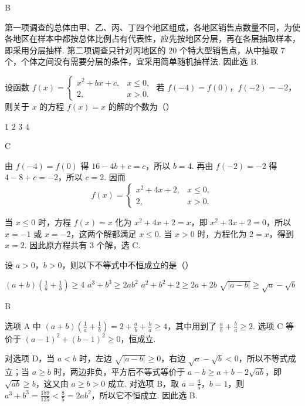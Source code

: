\begin{answer}
B
\end{answer}

\begin{solution}
第一项调查的总体由甲、乙、丙、丁四个地区组成，各地区销售点数量不同，为使各地区在样本中都按总体比例占有代表性，应先按地区分层，再在各层抽取样本，即采用分层抽样. 第二项调查只针对丙地区的 \(20\) 个特大型销售点，从中抽取 \(7\) 个，个体之间没有需要分层的条件，宜采用简单随机抽样法. 因此选 B.
\end{solution}

\begin{problem}
设函数 \(f(x)=\begin{cases}
x^2+bx+c, & x\leqslant 0,\\
2, & x>0.
\end{cases}\) 若 \(f(-4)=f(0)\)，\(f(-2)=-2\)，则关于 \(x\) 的方程 \(f(x)=x\) 的解的个数为（\quad）

\choices
    {\(1\)}
    {\(2\)}
    {\(3\)}
    {\(4\)}
\end{problem}

\begin{answer}
C
\end{answer}

\begin{solution}
由 \(f(-4)=f(0)\) 得 \(16-4b+c=c\)，所以 \(b=4\). 再由 \(f(-2)=-2\) 得 \(4-8+c=-2\)，所以 \(c=2\). 因而
\[
f(x)=\begin{cases}
x^2+4x+2,&x\leqslant0,\\
2,&x>0.
\end{cases}
\]

当 \(x\leqslant0\) 时，方程 \(f(x)=x\) 化为 \(x^2+4x+2=x\)，即 \(x^2+3x+2=0\)，所以 \(x=-1\) 或 \(x=-2\)，这两个解都满足 \(x\leqslant0\). 当 \(x>0\) 时，方程化为 \(2=x\)，得到 \(x=2\). 因此原方程共有 \(3\) 个解，选 C.
\end{solution}

\begin{problem}
设 \(a>0\)，\(b>0\)，则以下不等式中不恒成立的是（\quad）

\choices
    {\(\left(a+b\right)\left(\frac{1}{a}+\frac{1}{b}\right)\geqslant 4\)}
    {\(a^3+b^3\geqslant 2ab^2\)}
    {\(a^2+b^2+2\geqslant 2a+2b\)}
    {\(\sqrt{|a-b|}\geqslant \sqrt{a}-\sqrt{b}\)}
\end{problem}

\begin{answer}
B
\end{answer}

\begin{solution}
选项 A 中 \((a+b)\left(\frac{1}{a}+\frac{1}{b}\right)=2+\frac{a}{b}+\frac{b}{a}\geqslant4\)，其中用到了 \(\frac{a}{b}+\frac{b}{a}\geqslant2\). 选项 C 等价于 \((a-1)^2+(b-1)^2\geqslant0\)，恒成立.

对选项 D，当 \(a<b\) 时，左边 \(\sqrt{|a-b|}\geqslant0\)，右边 \(\sqrt a-\sqrt b<0\)，所以不等式成立；当 \(a\geqslant b\) 时，两边非负，平方后不等式等价于 \(a-b\geqslant a+b-2\sqrt{ab}\)，即 \(\sqrt{ab}\geqslant b\)，这又由 \(a\geqslant b>0\) 成立. 对选项 B，取 \(a=\frac{4}{5}\)，\(b=1\)，则 \(a^3+b^3=\frac{189}{125}<\frac{8}{5}=2ab^2\)，所以它不恒成立. 因此选 B.
\end{solution}

